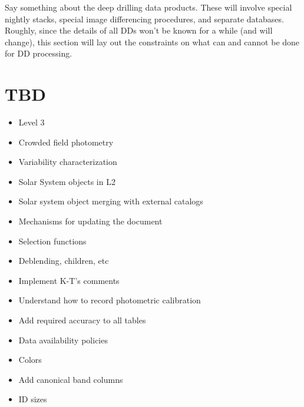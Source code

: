 \documentclass[12pt]{article}
\begin{document}
Say something about the deep drilling data products. These will involve special nightly stacks, special image differencing procedures, and separate databases. Roughly, since the details of all DDs won't be known for a while (and will change), this section will lay out the constraints on what can and cannot be done for DD processing.

\section{TBD}

\begin{itemize}

    \item Level 3
    \item Crowded field photometry
    \item Variability characterization
    \item Solar System objects in L2
    \item Solar system object merging with external catalogs
    \item Mechanisms for updating the document

    \item Selection functions
    \item Deblending, children, etc
    \item Implement K-T's comments
    \item Understand how to record photometric calibration
    \item Add required accuracy to all tables

    \item Data availability policies
    \item Colors
    \item Add canonical band columns
    \item ID sizes

\end{itemize}
\end{document}
